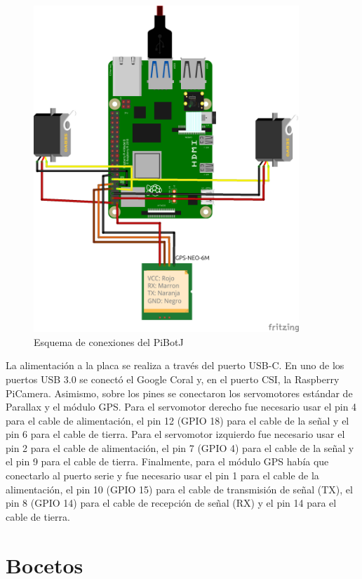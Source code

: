 \begin{figure} [h!]
	\begin{center}
		\includegraphics[width=10cm]{figs/cap5/modelocompleto_bb3.png}
	\end{center}
	\caption{Esquema de conexiones del PiBotJ} 
	\label{fig:fritzzing}
\end{figure}


La alimentación a la placa se realiza a través del puerto USB-C. En uno de los puertos USB 3.0 se conectó el Google Coral y, en el puerto CSI, la Raspberry PiCamera. Asimismo, sobre los pines se conectaron los servomotores estándar de Parallax y el módulo GPS. Para el servomotor derecho fue necesario usar el pin 4 para el cable de alimentación, el pin 12 (GPIO 18) para el cable de la señal y el pin 6 para el cable de tierra. Para el servomotor izquierdo fue necesario usar el pin 2 para el cable de alimentación, el pin 7 (GPIO 4) para el cable de la señal y el pin 9 para el cable de tierra. Finalmente, para el módulo GPS había que conectarlo al puerto serie y fue necesario usar el pin 1 para el cable de la alimentación, el pin 10 (GPIO 15) para el cable de transmisión de señal (TX), el pin 8 (GPIO 14) para el cable de recepción de señal (RX) y el pin 14 para el cable de tierra. 

 
\section{Bocetos}
\label{sec:bocetos}

